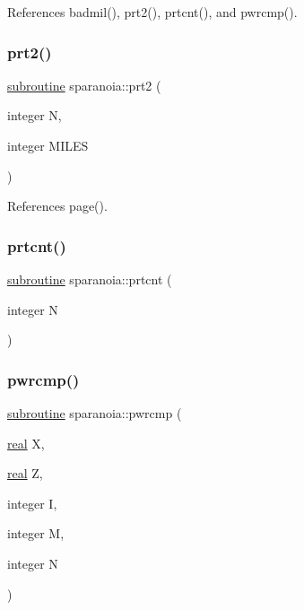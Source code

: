 References badmil(), prt2(), prtcnt(), and pwrcmp().

\mbox{\label{sparanoia_8f90_a4366a5bd15fdd00f94aacbdc95b58930}} 
\subsubsection{\texorpdfstring{prt2()}{prt2()}}
{\footnotesize\ttfamily \hyperlink{M__stopwatch_83_8txt_acfbcff50169d691ff02d4a123ed70482}{subroutine} sparanoia\+::prt2 (\begin{DoxyParamCaption}\item[{integer}]{N,  }\item[{integer}]{M\+I\+L\+ES }\end{DoxyParamCaption})}



References page().

\mbox{\label{sparanoia_8f90_a4613c6de1358a9fe77d1a9f4aaa8e1c6}} 
\subsubsection{\texorpdfstring{prtcnt()}{prtcnt()}}
{\footnotesize\ttfamily \hyperlink{M__stopwatch_83_8txt_acfbcff50169d691ff02d4a123ed70482}{subroutine} sparanoia\+::prtcnt (\begin{DoxyParamCaption}\item[{integer}]{N }\end{DoxyParamCaption})}

\mbox{\label{sparanoia_8f90_afc3a5a8e4b6d1ff954a3b5cfa5d754e0}} 
\subsubsection{\texorpdfstring{pwrcmp()}{pwrcmp()}}
{\footnotesize\ttfamily \hyperlink{M__stopwatch_83_8txt_acfbcff50169d691ff02d4a123ed70482}{subroutine} sparanoia\+::pwrcmp (\begin{DoxyParamCaption}\item[{\hyperlink{read__watch_83_8txt_abdb62bde002f38ef75f810d3a905a823}{real}}]{X,  }\item[{\hyperlink{read__watch_83_8txt_abdb62bde002f38ef75f810d3a905a823}{real}}]{Z,  }\item[{integer}]{I,  }\item[{integer}]{M,  }\item[{integer}]{N }\end{DoxyParamCaption})}




